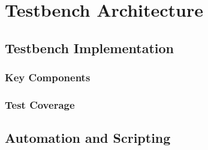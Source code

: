 \chapter{Testbench Architecture}
\label{cha:testbench_architecture}

\section{Testbench Implementation}

\subsection{Key Components}

\subsection{Test Coverage}

\section{Automation and Scripting}
